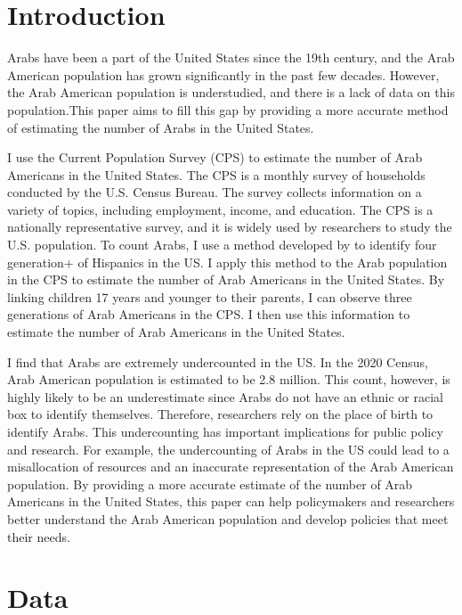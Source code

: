 \section{Introduction}\label{sec:intro}

Arabs have been a part of the United States since the 19th century, and the Arab American population has grown significantly in the past few decades. However, the Arab American population is understudied, and there is a lack of data on this population.This paper aims to fill this gap by providing a more accurate method of estimating the number of Arabs in the United States. 

I use the Current Population Survey (CPS) to estimate the number of Arab Americans in the United States. The CPS is a monthly survey of households conducted by the U.S. Census Bureau. The survey collects information on a variety of topics, including employment, income, and education. The CPS is a nationally representative survey, and it is widely used by researchers to study the U.S. population. To count Arabs, I use a method developed by \textcite{antmanEthnicAttritionObserved2016} to identify four generation+ of Hispanics in the US. I apply this method to the Arab population in the CPS to estimate the number of Arab Americans in the United States. By linking children 17 years and younger to their parents, I can observe three generations of Arab Americans in the CPS. I then use this information to estimate the number of Arab Americans in the United States.

I find that Arabs are extremely undercounted in the US. In the 2020 Census, Arab American population is estimated to be 2.8 million. This count, however, is highly likely to be an underestimate since Arabs do not have an ethnic or racial box to identify themselves. Therefore, researchers rely on the place of birth to identify Arabs. This undercounting has important implications for public policy and research. For example, the undercounting of Arabs in the US could lead to a misallocation of resources and an inaccurate representation of the Arab American population. By providing a more accurate estimate of the number of Arab Americans in the United States, this paper can help policymakers and researchers better understand the Arab American population and develop policies that meet their needs.

\section{Data}\label{sec:data}

